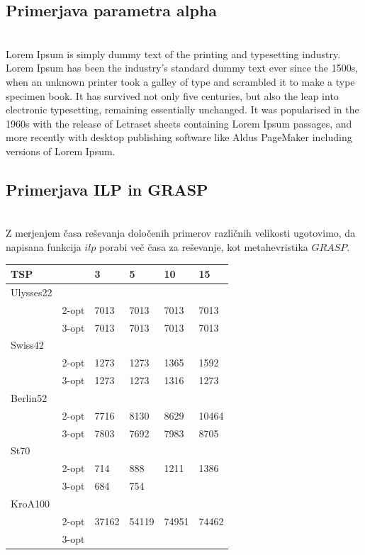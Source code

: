 \documentclass[12pt,a4paper]{amsart}
\theoremstyle{definition} %
\theoremstyle{plain} %
\begin{document}
\subsection{Primerjava parametra alpha} ~\\
Lorem Ipsum is simply dummy text of the printing and typesetting industry. Lorem Ipsum has been the industry's standard dummy text ever since the 1500s, when an unknown printer took a galley of type and scrambled it to make a type specimen book. It has survived not only five centuries, but also the leap into electronic typesetting, remaining essentially unchanged. It was popularised in the 1960s with the release of Letraset sheets containing Lorem Ipsum passages, and more recently with desktop publishing software like Aldus PageMaker including versions of Lorem Ipsum. %


\subsection{Primerjava ILP in GRASP} ~\\
Z merjenjem časa reševanja določenih primerov različnih velikosti ugotovimo, da napisana funkcija $ilp$ porabi več časa za reševanje, kot metahevristika $GRASP$. 

\begin{table}[h]
\begin{tabular}{llllll}
\rowcolor[HTML]{FFCCC9} 
TSP       &      & 3 & 5 & 10 & 15 \\ \hline
Ulysses22 &      &   &   &    &    \\
          & 2-opt & 7013  &  7013 & 7013   & 7013   \\
          & 3-opt &   7013&  7013 &  7013  &  7013  \\
Swiss42   &      &   &   &    &    \\
	& 2-opt &   1273&  1273 &   1365 &  1592  \\
          & 3-opt &  1273 &  1273 & 1316   &  1273  \\
Berlin52 &      &   &   &    &    \\
	 & 2-opt &  7716 & 8130 &   8629 &  10464  \\
          & 3-opt &  7803 &  7692 &  7983  & 8705   \\
St70      &      &   &   &    &    \\
	& 2-opt &  714 &  888 &   1211 &  1386  \\
          & 3-opt &  684 &  754 &    &    \\
KroA100   &      &   &   &    &    \\
	& 2-opt &  37162 &  54119 &   74951 &   74462 \\
          & 3-opt &   &   &    &   
\end{tabular}
\end{table}
\end{document}
